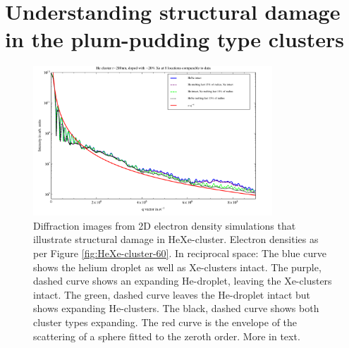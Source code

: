 %
%
%
%
%
%
\section{Understanding structural damage in the plum-pudding type clusters}\label{sec:helium-xenon-data}
\begin{figure}
	\centering
		\includegraphics[width=0.80\textwidth]{images/results/simulations-damage-explain.pdf}
	\caption[Simulated structural damage scenarios in HeXe-clusters.]{Diffraction images from 2D electron density simulations that illustrate structural damage in HeXe-cluster. Electron densities as per Figure \ref{fig:HeXe-cluster-60}. In reciprocal space: The blue curve shows the helium droplet as well as Xe-clusters intact. The purple, dashed curve shows an expanding He-droplet, leaving the Xe-clusters intact. The green, dashed curve leaves the He-droplet intact but shows expanding He-clusters. The black, dashed curve shows both cluster types expanding. The red curve is the envelope of the scattering of a sphere fitted to the zeroth order. More in text.}
	\label{fig:simulations-damage-explain}
\end{figure}

